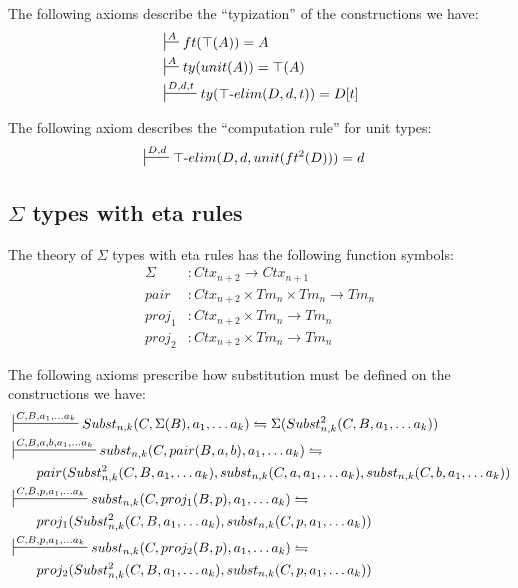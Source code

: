 \documentclass{amsart}
\theoremstyle{definition}
\theoremstyle{remark}
\numberwithin{figure}{section}
\begin{document}
The following axioms describe the ``typization'' of the constructions we have:
\begin{align*}
& \sststile{}{A} ft(\top(A)) = A \\
& \sststile{}{A} ty(unit(A)) = \top(A) \\
& \sststile{}{D, d, t} ty(\top\text{-}elim(D, d, t)) = D[t]
\end{align*}

The following axiom describes the ``computation rule'' for unit types:
\begin{align*}
& \sststile{}{D, d} \top\text{-}elim(D, d, unit(ft^2(D))) = d
\end{align*}

\subsection{$\Sigma$ types with eta rules}

The theory of $\Sigma$ types with eta rules has the following function symbols:
\begin{align*}
\Sigma & : Ctx_{n+2} \to Ctx_{n+1} \\
pair   & : Ctx_{n+2} \times Tm_n \times Tm_n \to Tm_n \\
proj_1 & : Ctx_{n+2} \times Tm_n \to Tm_n \\
proj_2 & : Ctx_{n+2} \times Tm_n \to Tm_n
\end{align*}

The following axioms prescribe how substitution must be defined on the constructions we have:
\begin{align*}
& \sststile{}{C, B, a_1, \ldots a_k} Subst_{n,k}(C, \Sigma(B), a_1, \ldots a_k) \leftrightharpoons \Sigma(Subst^2_{n,k}(C, B, a_1, \ldots a_k)) \\
& \sststile{}{C, B, a, b, a_1, \ldots a_k} subst_{n,k}(C, pair(B, a, b), a_1, \ldots a_k) \leftrightharpoons \\
& \qquad pair(Subst^2_{n,k}(C, B, a_1, \ldots a_k), subst_{n,k}(C, a, a_1, \ldots a_k), subst_{n,k}(C, b, a_1, \ldots a_k)) \\
& \sststile{}{C, B, p, a_1, \ldots a_k} subst_{n,k}(C, proj_1(B, p), a_1, \ldots a_k) \leftrightharpoons \\
& \qquad proj_1(Subst^2_{n,k}(C, B, a_1, \ldots a_k), subst_{n,k}(C, p, a_1, \ldots a_k)) \\
& \sststile{}{C, B, p, a_1, \ldots a_k} subst_{n,k}(C, proj_2(B, p), a_1, \ldots a_k) \leftrightharpoons \\
& \qquad proj_2(Subst^2_{n,k}(C, B, a_1, \ldots a_k), subst_{n,k}(C, p, a_1, \ldots a_k))
\end{align*}
\end{document}
